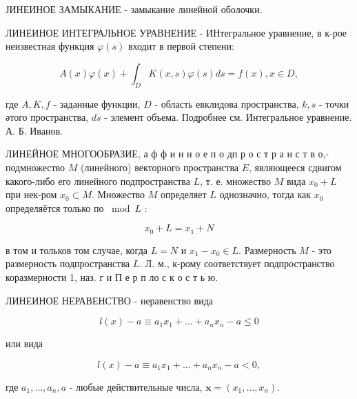 \documentclass[10pt]{article}
\begin{document}
ЈИНЕИНОЕ ЗАМЫКАНИЕ - замыкание линейной оболочки.



ЛИНЕИНОЕ ИНТЕГРАЛЬНОЕ УРАВНЕНИЕ - ИНтегральное уравнение, в к-рое неизвестная функция $\varphi(s)$ входит в первой степени:



\[

A(x) \varphi(x)+\int_{D} K(x, s) \varphi(s) d s=f(x), x \in D,

\]



где $A, K, f$ - заданные функции, $D$ - область евклидова пространства, $k, s$ - точки әтого пространства, $d s$ - элемент объема. Подробнее см. Интегральное уравнение. А. Б. Иванов.



ЛИНЕЙНОЕ МНОГООБРАЗИЕ, а ф ф и н н $о$ е п о дп р о с т р а н с т в о,- подмножество $M$ (линейного) векторного пространства $E$, являющееся сдвигом какого-либо его линейного подпространства $L$, т. е. множество $M$ вида $x_{0}+L$ при нек-ром $x_{0} \subset M$. Множество $M$ определяет $L$ однозначно, тогда как $x_{0}$ определяётся только по $\bmod L$ :



\[

x_{0}+L=x_{1}+N

\]



в том и тольков том случае, когда $L=N$ и $x_{1}-x_{0} \in L$. Размерность $M$ - это размерность подпространства $L$. Л. м., к-рому соответствует подпространство коразмерности 1, наз. г и П е р п ло с к о с т ь ю.



ЛИНЕИНОЕ НЕРАВЕНСТВО - неравенство вида



\[

l(x)-a \equiv a_{1} x_{1}+\ldots+a_{n} x_{n}-a \leqslant 0

\]



или вида



\[

l(x)-a \equiv a_{1} x_{1}+\ldots+a_{n} x_{n}-a<0,

\]



где $a_{1}, \ldots, a_{n}, a$ - любые действительные числа, $\boldsymbol{x}=\left(x_{1}, \ldots, x_{n}\right)$.
\end{document}
